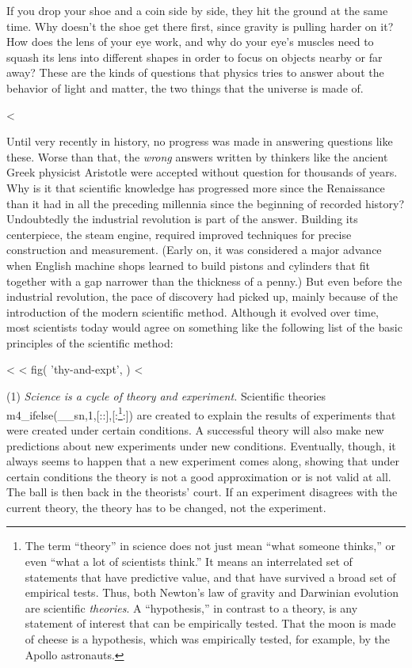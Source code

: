 If you drop your shoe and a coin side by side, they hit the
ground at the same time. Why doesn't the shoe get there
first, since gravity is pulling harder on it? How does the
lens of your eye work, and why do your eye's muscles need to
squash its lens into different shapes in order to focus on
objects nearby or far away? These are the kinds of questions
that physics tries to answer about the behavior of light and
matter, the two things that the universe is made of.

<%

Until very recently in history, no progress was made in
answering questions like these. Worse than that, the
\emph{wrong} answers written by thinkers like the ancient
Greek physicist Aristotle were accepted without question for
thousands of years. Why is it that scientific knowledge has
progressed more since the Renaissance
than it had in all the preceding millennia since the
beginning of recorded history? Undoubtedly the industrial
revolution is part of the answer. Building its centerpiece,
the steam engine, required improved techniques for precise
construction and measurement. (Early on, it was considered a
major advance when English machine shops learned to build
pistons and cylinders that fit together with a gap narrower
than the thickness of a penny.) But even before the
industrial revolution, the pace of discovery had picked up,
mainly because of the introduction of the modern scientific
method. Although it evolved over time, most scientists today
would agree on something like the following list of the
basic principles of the scientific method:

<%
<%
  fig(
    'thy-and-expt',
  )
<%

(1) \emph{Science is a cycle of theory and experiment.}
Scientific theories %
m4_ifelse(__sn,1,[::],[:\footnote{The term ``theory'' in science does not just mean ``what someone thinks,'' or even ``what a lot of scientists think.'' It means
an interrelated set of statements that have predictive value, and that have survived a broad set of empirical tests. Thus, both Newton's law of gravity and
Darwinian evolution are scientific \emph{theories}. A ``hypothesis,'' in contrast to a theory, is any statement of interest that can be empirically tested.
That the moon is made of cheese is a hypothesis, which was empirically tested, for example, by the Apollo
astronauts.}:]) %
are created to explain the results of
experiments that were created under certain conditions. A
successful theory will also make new predictions about new
experiments under new conditions. Eventually, though, it
always seems to happen that a new experiment comes along,
showing that under certain conditions the theory is not a
good approximation or is not valid at all. The ball is then
back in the theorists' court. If an experiment disagrees
with the current theory, the theory has to be changed, not the experiment.

